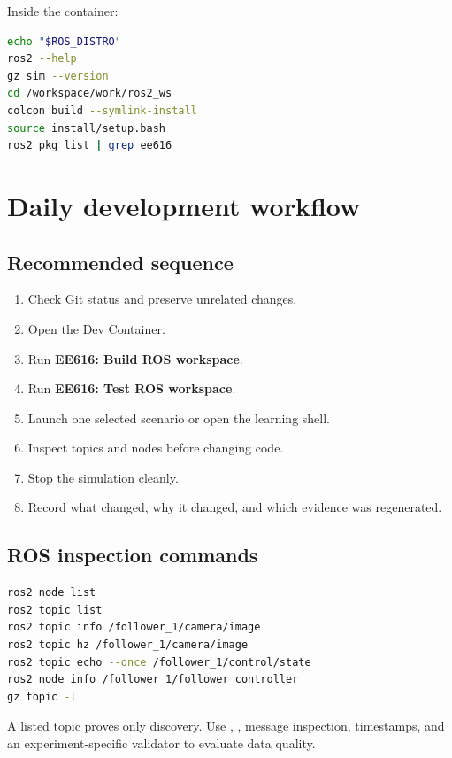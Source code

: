 \documentclass[11pt,oneside,openany]{book}
\newcommand{\file}[1]{\path{#1}}
\begin{document}
Inside the container:
\begin{lstlisting}[language=bash]
echo "$ROS_DISTRO"
ros2 --help
gz sim --version
cd /workspace/work/ros2_ws
colcon build --symlink-install
source install/setup.bash
ros2 pkg list | grep ee616
\end{lstlisting}

\chapter{Daily development workflow}

\section{Recommended sequence}

\begin{enumerate}
  \item Check Git status and preserve unrelated changes.
  \item Open the Dev Container.
  \item Run \textbf{EE616: Build ROS workspace}.
  \item Run \textbf{EE616: Test ROS workspace}.
  \item Launch one selected scenario or open the learning shell.
  \item Inspect topics and nodes before changing code.
  \item Stop the simulation cleanly.
  \item Record what changed, why it changed, and which evidence was regenerated.
\end{enumerate}

\section{ROS inspection commands}

\begin{lstlisting}[language=bash]
ros2 node list
ros2 topic list
ros2 topic info /follower_1/camera/image
ros2 topic hz /follower_1/camera/image
ros2 topic echo --once /follower_1/control/state
ros2 node info /follower_1/follower_controller
gz topic -l
\end{lstlisting}

A listed topic proves only discovery. Use \file{topic info}, \file{topic hz}, message inspection, timestamps, and an experiment-specific validator to evaluate data quality.
\end{document}
